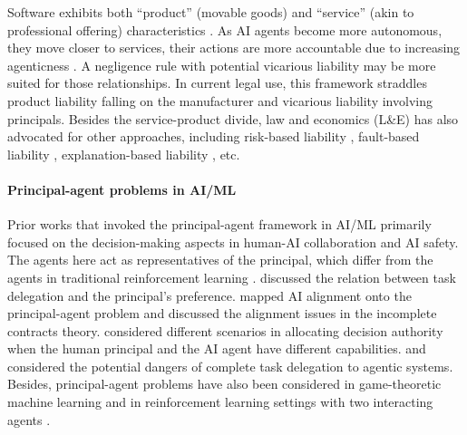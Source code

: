 \documentclass[11pt]{article}
\begin{document}
Software exhibits both ``product'' (movable goods) and ``service'' (akin to professional offering) characteristics \citep{gemignani1980product,popp_software_2011}. As AI agents become more autonomous, they move closer to services, their actions are more accountable due to increasing agenticness \citep{chopra_legal_2011,chan_harms_2023}. A negligence rule with potential vicarious liability may be more suited \citep{turner2018robot} for those relationships. In current legal use, this framework straddles product liability falling on the manufacturer and vicarious liability involving principals. Besides the service-product divide, law and economics (L\&E) has also advocated for other approaches, including risk-based liability \citep{geistfeld_comparative_2022}, fault-based liability \citep{buiten_law_2023}, explanation-based liability \citep{padovan_black_2023}, etc.

\paragraph{Principal-agent problems in AI/ML} Prior works that invoked the principal-agent framework in AI/ML primarily focused on the decision-making aspects in human-AI collaboration and AI safety. The agents here act as representatives of the principal, which differ from the agents in traditional reinforcement learning \citep{diaz_milnor-myerson_2024}. \citet{lubars_ask_2019} discussed the relation between task delegation and the principal's preference. \citet{hadfield2019incomplete} mapped AI alignment onto the principal-agent problem and discussed the alignment issues in the incomplete contracts theory. \citet{athey_allocation_2020} considered different scenarios in allocating decision authority when the human principal and the AI agent have different capabilities. \citet{critch_xrisk_2020} and \citet{hendrycks_natural_2023} considered the potential dangers of complete task delegation to agentic systems. Besides, principal-agent problems have also been considered in game-theoretic machine learning \citep{gan_generalized_2024} and in reinforcement learning settings with two interacting agents \citep{ivanov_pap_2024}.
\end{document}
